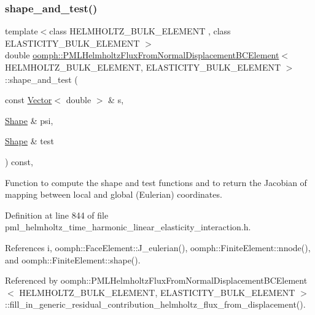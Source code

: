 \subsubsection{\texorpdfstring{shape\+\_\+and\+\_\+test()}{shape\_and\_test()}}
{\footnotesize\ttfamily template$<$class H\+E\+L\+M\+H\+O\+L\+T\+Z\+\_\+\+B\+U\+L\+K\+\_\+\+E\+L\+E\+M\+E\+NT , class E\+L\+A\+S\+T\+I\+C\+I\+T\+Y\+\_\+\+B\+U\+L\+K\+\_\+\+E\+L\+E\+M\+E\+NT $>$ \\
double \hyperlink{classoomph_1_1PMLHelmholtzFluxFromNormalDisplacementBCElement}{oomph\+::\+P\+M\+L\+Helmholtz\+Flux\+From\+Normal\+Displacement\+B\+C\+Element}$<$ H\+E\+L\+M\+H\+O\+L\+T\+Z\+\_\+\+B\+U\+L\+K\+\_\+\+E\+L\+E\+M\+E\+NT, E\+L\+A\+S\+T\+I\+C\+I\+T\+Y\+\_\+\+B\+U\+L\+K\+\_\+\+E\+L\+E\+M\+E\+NT $>$\+::shape\+\_\+and\+\_\+test (\begin{DoxyParamCaption}\item[{const \hyperlink{classoomph_1_1Vector}{Vector}$<$ double $>$ \&}]{s,  }\item[{\hyperlink{classoomph_1_1Shape}{Shape} \&}]{psi,  }\item[{\hyperlink{classoomph_1_1Shape}{Shape} \&}]{test }\end{DoxyParamCaption}) const\hspace{0.3cm}{\ttfamily [inline]}, {\ttfamily [protected]}}



Function to compute the shape and test functions and to return the Jacobian of mapping between local and global (Eulerian) coordinates. 



Definition at line 844 of file pml\+\_\+helmholtz\+\_\+time\+\_\+harmonic\+\_\+linear\+\_\+elasticity\+\_\+interaction.\+h.



References i, oomph\+::\+Face\+Element\+::\+J\+\_\+eulerian(), oomph\+::\+Finite\+Element\+::nnode(), and oomph\+::\+Finite\+Element\+::shape().



Referenced by oomph\+::\+P\+M\+L\+Helmholtz\+Flux\+From\+Normal\+Displacement\+B\+C\+Element$<$ H\+E\+L\+M\+H\+O\+L\+T\+Z\+\_\+\+B\+U\+L\+K\+\_\+\+E\+L\+E\+M\+E\+N\+T, E\+L\+A\+S\+T\+I\+C\+I\+T\+Y\+\_\+\+B\+U\+L\+K\+\_\+\+E\+L\+E\+M\+E\+N\+T $>$\+::fill\+\_\+in\+\_\+generic\+\_\+residual\+\_\+contribution\+\_\+helmholtz\+\_\+flux\+\_\+from\+\_\+displacement().

\mbox{\label{classoomph_1_1PMLHelmholtzFluxFromNormalDisplacementBCElement_ac0c13560b5e8dba19dc11f44f455bf97}} 

